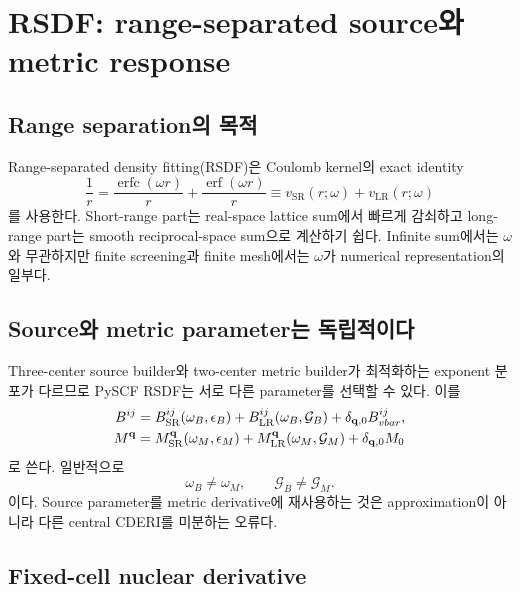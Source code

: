 \section{RSDF: range-separated source와 metric response}
\label{sec:rsdf}

\subsection{Range separation의 목적}

Range-separated density fitting(RSDF)은 Coulomb kernel의 exact identity
\begin{equation}
  \frac1r
  =\frac{\operatorname{erfc}(\omega r)}{r}
   +\frac{\operatorname{erf}(\omega r)}{r}
  \equiv v_{\mathrm{SR}}(r;\omega)+v_{\mathrm{LR}}(r;\omega)
  \label{eq:rsdf-range-separation}
\end{equation}
를 사용한다. Short-range part는 real-space lattice sum에서 빠르게 감쇠하고 long-range
part는 smooth reciprocal-space sum으로 계산하기 쉽다. Infinite sum에서는 $\omega$와
무관하지만 finite screening과 finite mesh에서는 $\omega$가 numerical representation의
일부다.

\subsection{Source와 metric parameter는 독립적이다}

Three-center source builder와 two-center metric builder가 최적화하는 exponent 분포가
다르므로 PySCF RSDF는 서로 다른 parameter를 선택할 수 있다. 이를
\begin{align}
  B^{ij}
  &=B_{\mathrm{SR}}^{ij}(\omega_B,\epsilon_B)
    +B_{\mathrm{LR}}^{ij}(\omega_B,\mathcal G_B)
    +\delta_{\mathbf{q},0}B_{vbar}^{ij},
  \label{eq:rsdf-source-split}\\
  M^{\mathbf{q}}
  &=M_{\mathrm{SR}}^{\mathbf{q}}(\omega_M,\epsilon_M)
    +M_{\mathrm{LR}}^{\mathbf{q}}(\omega_M,\mathcal G_M)
    +\delta_{\mathbf{q},0}M_0
  \label{eq:rsdf-metric-split}
\end{align}
로 쓴다. 일반적으로
\begin{equation}
  \omega_B\ne\omega_M,
  \qquad \mathcal G_B\ne\mathcal G_M.
  \label{eq:rsdf-independent-parameters}
\end{equation}
이다. Source parameter를 metric derivative에 재사용하는 것은 approximation이 아니라
다른 central CDERI를 미분하는 오류다.

\subsection{Fixed-cell nuclear derivative}


